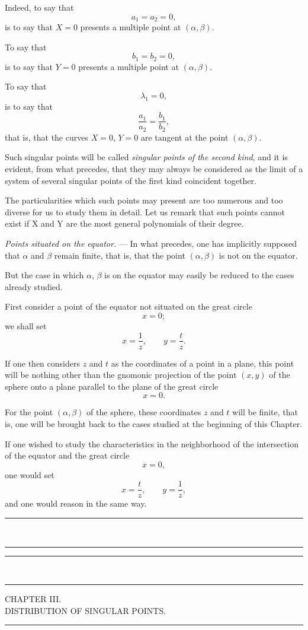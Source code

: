 \documentclass[11pt]{article}
\newcommand{\ornament}{\begin{center}\rule{2.5em}{0.4pt}\,\raisebox{0.1ex}{\tiny$\bullet\bullet\bullet$}\,\rule{2.5em}{0.4pt}\end{center}}
\newcommand{\shortline}{\begin{center}\rule{3.5em}{0.4pt}\end{center}}
\begin{document}
Indeed, to say that
\[
a_1=a_2=0,
\]
is to say that $X=0$ presents a multiple point at $(\alpha,\beta)$.

To say that
\[
b_1=b_2=0,
\]
is to say that $Y=0$ presents a multiple point at $(\alpha,\beta)$.

To say that
\[
\lambda_1=0,
\]
is to say that
\[
\frac{a_1}{a_2}=\frac{b_1}{b_2},
\]
that is, that the curves $X=0$, $Y=0$ are tangent at the point $(\alpha,\beta)$.

Such singular points will be called \emph{singular points of the second kind}, and it is evident, from what precedes, that they may always be considered as the limit of a system of several singular points of the first kind coincident together.

The particularities which such points may present are too numerous and too diverse for us to study them in detail. Let us remark that such points cannot exist if X and Y are the most general polynomials of their degree.

\emph{Points situated on the equator.} --- In what precedes, one has implicitly supposed that $\alpha$ and $\beta$ remain finite, that is, that the point $(\alpha,\beta)$ is not on the equator.

But the case in which $\alpha$, $\beta$ is on the equator may easily be reduced to the cases already studied.

First consider a point of the equator not situated on the great circle
\[
x=0;
\]
we shall set
\[
x=\frac1z,
\qquad
y=\frac{t}{z}.
\]

If one then considers $z$ and $t$ as the coordinates of a point in a plane, this point will be nothing other than the gnomonic projection of the point $(x,y)$ of the sphere onto a plane parallel to the plane of the great circle
\[
x=0.
\]

For the point $(\alpha,\beta)$ of the sphere, these coordinates $z$ and $t$ will be finite, that is, one will be brought back to the cases studied at the beginning of this Chapter.

If one wished to study the characteristics in the neighborhood of the intersection of the equator and the great circle
\[
x=0,
\]
one would set
\[
x=\frac{t}{z},
\qquad
 y=\frac1z,
\]
and one would reason in the same way.

\ornament


\ornament
\begin{center}
{\Large CHAPTER III.}\\[0.4em]
{\small DISTRIBUTION OF SINGULAR POINTS.}
\end{center}
\shortline
\end{document}
